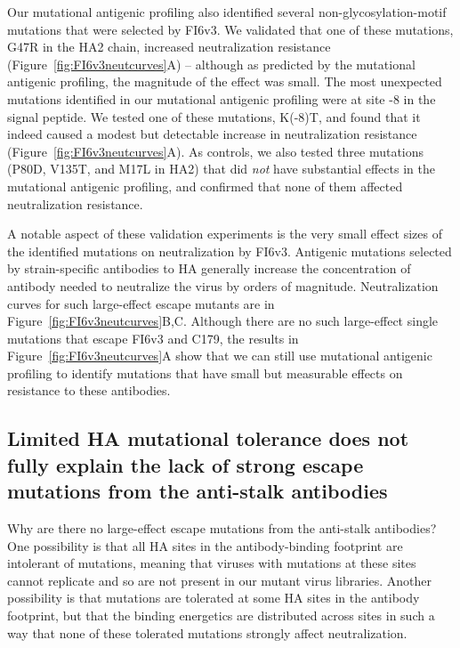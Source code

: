 \documentclass[11pt]{article}
\begin{document}
Our mutational antigenic profiling also identified several non-glycosylation-motif mutations that were selected by FI6v3.
We validated that one of these mutations, G47R in the HA2 chain, increased neutralization resistance (Figure~\ref{fig:FI6v3neutcurves}A) -- although as predicted by the mutational antigenic profiling, the magnitude of the effect was small.
The most unexpected mutations identified in our mutational antigenic profiling were at site -8 in the signal peptide.
We tested one of these mutations, K(-8)T, and found that it indeed caused a modest but detectable increase in neutralization resistance (Figure~\ref{fig:FI6v3neutcurves}A).
As controls, we also tested three mutations (P80D, V135T, and M17L in HA2) that did \emph{not} have substantial effects in the mutational antigenic profiling, and confirmed that none of them affected neutralization resistance.

A notable aspect of these validation experiments is the very small effect sizes of the identified mutations on neutralization by FI6v3.
Antigenic mutations selected by strain-specific antibodies to HA generally increase the concentration of antibody needed to neutralize the virus by orders of magnitude.
Neutralization curves for such large-effect escape mutants are in Figure~\ref{fig:FI6v3neutcurves}B,C.
Although there are no such large-effect single mutations that escape FI6v3 and C179, the results in Figure~\ref{fig:FI6v3neutcurves}A show that we can still use mutational antigenic profiling to identify mutations that have small but measurable effects on resistance to these antibodies.

\subsection*{Limited HA mutational tolerance does not fully explain the lack of strong escape mutations from the anti-stalk antibodies}
Why are there no large-effect escape mutations from the anti-stalk antibodies?
One possibility is that all HA sites in the antibody-binding footprint are intolerant of mutations, meaning that viruses with mutations at these sites cannot replicate and so are not present in our mutant virus libraries.
Another possibility is that mutations are tolerated at some HA sites in the antibody footprint, but that the binding energetics are distributed across sites in such a way that none of these tolerated mutations strongly affect neutralization.
\end{document}
